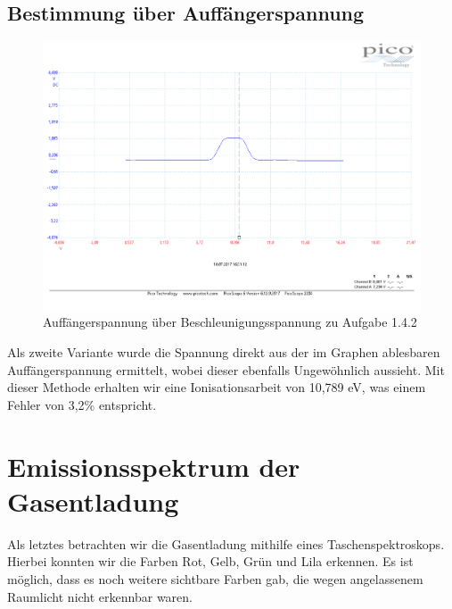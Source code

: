 \subsection{Bestimmung über Auffängerspannung}
\begin{figure}
	\includegraphics[width=\textwidth]{../Daten/Aufgabe1/Frank_Hertz_1_4_b_2.pdf}
	\caption{Auffängerspannung über Beschleunigungsspannung zu Aufgabe 1.4.2}
\end{figure}
Als zweite Variante wurde die Spannung direkt aus der im Graphen ablesbaren Auffängerspannung ermittelt, wobei dieser ebenfalls Ungewöhnlich aussieht. Mit dieser Methode erhalten wir eine Ionisationsarbeit von 10,789 eV, was einem Fehler von 3,2\% entspricht.
\section{Emissionsspektrum der Gasentladung}
Als letztes betrachten wir die Gasentladung mithilfe eines Taschenspektroskops. Hierbei konnten wir die Farben Rot, Gelb, Grün und Lila erkennen. Es ist möglich, dass es noch weitere sichtbare Farben gab, die wegen angelassenem Raumlicht nicht erkennbar waren.